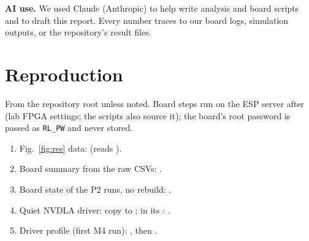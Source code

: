 \documentclass[conference,10pt,letterpaper]{IEEEtran}
\begin{document}
\smallskip\noindent\textbf{AI use.} We used Claude (Anthropic) to help write analysis and board scripts and to draft this report. Every number traces to our board logs, simulation outputs, or the repository's result files.




\appendices
\section{Reproduction}
{\footnotesize
From the repository root unless noted. Board steps run on the ESP server after  (lab FPGA settings; the scripts also source it); the board's root password is passed as \texttt{RL\_PW} and never stored.
\begin{enumerate}
\item Fig.~\ref{fig:res} data:  (reads ).
\item Board summary from the raw CSVs: .
\item Board state of the P2 runs, no rebuild: .
\item Quiet NVDLA driver: copy  to ; in its : .
\item Driver profile (first M4 run): , then .
\end{enumerate}}
\end{document}
